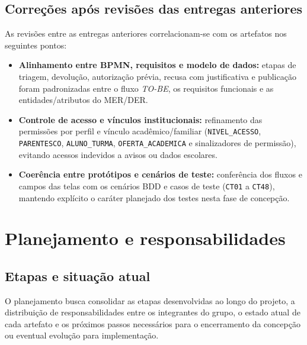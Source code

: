 \documentclass[a4paper,12pt]{report}
\begin{document}
\section{Correções após revisões das entregas anteriores}

As revisões entre as entregas anteriores correlacionam-se com os artefatos nos seguintes pontos:

\begin{itemize}
    \item \textbf{Alinhamento entre BPMN, requisitos e modelo de dados:} etapas de triagem, devolução, autorização prévia, recusa com justificativa e publicação foram padronizadas entre o fluxo \textit{TO-BE}, os requisitos funcionais e as entidades/atributos do MER/DER.
    \item \textbf{Controle de acesso e vínculos institucionais:} refinamento das permissões por perfil e vínculo acadêmico/familiar (\texttt{NIVEL\_ACESSO}, \texttt{PARENTESCO}, \texttt{ALUNO\_TURMA}, \texttt{OFERTA\_ACADEMICA} e sinalizadores de permissão), evitando acessos indevidos a avisos ou dados escolares.
    \item \textbf{Coerência entre protótipos e cenários de teste:} conferência dos fluxos e campos das telas com os cenários BDD e casos de teste (\texttt{CT01} a \texttt{CT48}), mantendo explícito o caráter planejado dos testes nesta fase de concepção.
\end{itemize}

\chapter{Planejamento e responsabilidades}

\section{Etapas e situação atual}

O planejamento busca consolidar as etapas desenvolvidas ao longo do projeto, a distribuição de responsabilidades entre os integrantes do grupo, o estado atual de cada artefato e os próximos passos necessários para o encerramento da concepção ou eventual evolução para implementação.
\end{document}
